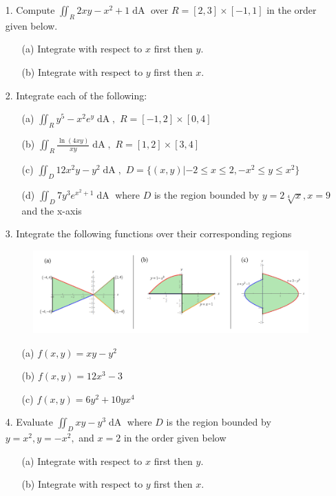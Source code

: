 \documentclass[12pt, amssymb, one column]{article}
\begin{document}
\begin{itemize}
	\item[1.] Compute $\iint_R 2xy-x^2+1 \mathop{dA} $ over $R=[2,3] \times [-1,1]$ in the order given below.
	\begin{itemize}
		\item[(a)] Integrate with respect to $x$ first then $y$.
		\item[(b)] Integrate with respect to $y$ first then $x$.
	\end{itemize}
	
	\item[2.] Integrate each of the following:
		\begin{itemize}
			\item[(a)] $\iint_R y^5-x^2e^y \mathop{dA}, \,\, R=[-1,2] \times [0,4]$
			\item[(b)] $\iint_R \frac{\ln(4xy)}{xy} \mathop{dA}, \,\, R=[1,2]\times[3,4]$
			\item[(c)] $\iint_D 12x^2y-y^2 \mathop{dA}, \,\, D=\{(x,y)|-2\leq x \leq 2, -x^2 \leq y \leq x^2\}$
			\item[(d)] $\iint_D 7y^3e^{x^2+1} \mathop{dA}$ where $D$ is the region bounded by $y=2\sqrt[4]{x},x=9$ and the x-axis
		\end{itemize}
	
	\item[3.] Integrate the following functions over their corresponding regions
	\begin{figure}[h]
		\centering
		\includegraphics[width=.8\textwidth]{regions.png}\\
	\end{figure}
		\begin{itemize}
			\item[(a)] $f(x,y) = xy-y^2$
			\item[(b)] $f(x,y) = 12x^3-3$
			\item[(c)] $f(x,y) = 6y^2 + 10yx^4$
		\end{itemize}
	
	\item[4.] Evaluate $\iint_D xy-y^3 \mathop{dA}$ where $D$ is the region bounded by $y=x^2, y=-x^2,$ and $x=2$ in the order given below
		\begin{itemize}
			\item[(a)] Integrate with respect to $x$ first then $y$.
			\item[(b)] Integrate with respect to $y$ first then $x$.
		\end{itemize}
	

\end{itemize}
\end{document}
